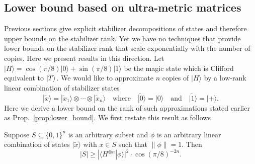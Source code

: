 \subsection{Lower bound based on ultra-metric matrices}
\label{Sec_ultra}
Previous sections give explicit stabilizer decompositions of states and therefore upper bounds on the stabilizer rank.   Yet we have no techniques that provide lower bounds on the stabilizer rank that scale exponentially with the number of copies.  Here we present results in this direction. Let $|H\rangle=\cos{(\pi/8)}|0\rangle + \sin{(\pi/8)}|1\rangle$ be the magic state which is Clifford equivalent to $\vert T\rangle$. We would like to approximate $n$ copies of $|H\rangle$ by a low-rank linear combination
of stabilizer states 
\[
|\tilde{x}\rangle =|\tilde{x}_1\rangle \otimes \cdots \otimes |\tilde{x}_n\rangle
\quad \mbox{where} \quad
|\tilde{0}\rangle=|0\rangle \quad \mbox{and} \quad
|\tilde{1}\rangle =|+\rangle.
\]
Here we derive a lower bound on the rank of such approximations stated earlier as Prop.~\ref{prop:lower_bound}.  We first restate this result as follows
\begin{theorem}
\label{thm:main}
Suppose $S\subseteq \{0,1\}^n$ is an arbitrary subset
and $\phi$ is an arbitrary   linear combination of states
$|\tilde{x}\rangle$ with $x\in S$ such that $\|\phi\|=1$.  Then 
\begin{equation}
|S|\ge |\langle H^{\otimes n}|\phi\rangle |^2 \cdot \cos{(\pi/8)}^{-2n}.
\end{equation}
\end{theorem}

